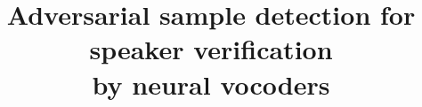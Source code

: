 \documentclass{article}
\title{Adversarial sample detection for speaker verification \\ by neural vocoders}
\begin{document}
\ninept

\maketitle
%










% 




% 
\end{document}
